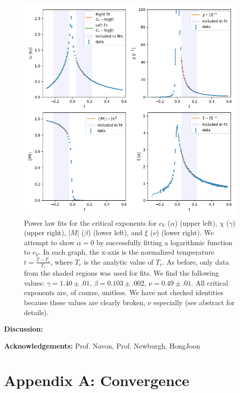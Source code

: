 \documentclass[letter,scriptaddress,twocolumn, prl,nofootinbib]{revtex4}
\begin{document}
\begin{figure}[h]
	\begin{center}
		\includegraphics[width=1\textwidth]{figs/fig5_crit_exponents.png}
		\caption{Power law fits for the critical exponents for $c_V$ ($\alpha$) (upper left), $\chi$ ($\gamma$) (upper right), $|M|$ ($\beta$) (lower left), and $\xi$ ($\nu$) (lower right). We attempt to show $\alpha = 0$ by successfully fitting a logarithmic function to $c_V$. In each graph, the x-axis is the normalized temperature $t = \frac{T - T_c}{T_c}$, where $T_c$ is the analytic value of $T_c$. As before, only data from the shaded regions was used for fits. We find the following values: $\gamma = 1.40 \pm .01$, $\beta = 0.103 \pm .002$, $\nu = 0.49 \pm .01$. All critical exponents are, of course, unitless. We have not checked identities because these values are clearly broken, $\nu$ especially (see abstract for details).}
		\label{fig:fig5}
	\end{center}
\end{figure}

\textbf{Discussion:}

\textbf{Acknowledgements:}
	Prof. Navon, Prof. Newburgh, HongJoon
	
 


\appendix
\section{Appendix A: Convergence}
\end{document}
